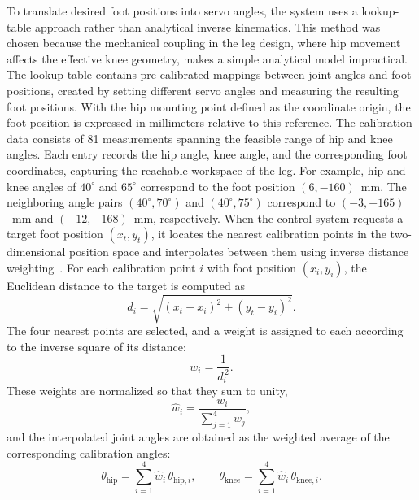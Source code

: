 \documentclass[a4paper,12pt]{report}
\begin{document}
To translate desired foot positions into servo angles, the system uses a lookup-table approach
rather than analytical inverse kinematics. This method was chosen because the mechanical coupling
in the leg design, where hip movement affects the effective knee geometry, makes a simple
analytical model impractical. The lookup table contains pre-calibrated mappings
between joint angles and foot positions, created by setting different servo angles and measuring
the resulting foot positions. With the hip mounting point defined as the coordinate origin, the
foot position is expressed in millimeters relative to this reference. The calibration data
consists of 81 measurements spanning the feasible range of hip and knee angles. Each entry records
the hip angle,
knee angle, and the corresponding foot coordinates, capturing the reachable workspace of the leg.
For example, hip and knee angles of $40^\circ$ and $65^\circ$ correspond to the foot position
$(6, -160)$~mm. The neighboring angle pairs $(40^\circ, 70^\circ)$ and
$(40^\circ, 75^\circ)$ correspond to $(-3, -165)$~mm and $(-12, -168)$~mm, respectively.
When the control system requests a target foot position $(x_t, y_t)$, it locates the nearest
calibration points in the two-dimensional position space and interpolates between them using inverse
distance weighting~\parencite{shepard1968}. For each calibration point $i$ with foot position
$(x_i, y_i)$, the Euclidean distance to the target is computed as
\begin{equation}
d_i = \sqrt{(x_t - x_i)^2 + (y_t - y_i)^2}.
\end{equation}
The four nearest points are selected, and a weight is assigned to each according to the inverse
square of its distance:
\begin{equation}
w_i = \frac{1}{d_i^{\,2}}.
\end{equation}
These weights are normalized so that they sum to unity,
\begin{equation}
\hat{w}_i = \frac{w_i}{\sum_{j=1}^{4} w_j},
\end{equation}
and the interpolated joint angles are obtained as the weighted average of the corresponding
calibration angles:
\begin{equation}
\theta_{\text{hip}} = \sum_{i=1}^{4} \hat{w}_i \, \theta_{\text{hip},i}, \qquad
\theta_{\text{knee}} = \sum_{i=1}^{4} \hat{w}_i \, \theta_{\text{knee},i}.
\end{equation}
\end{document}
